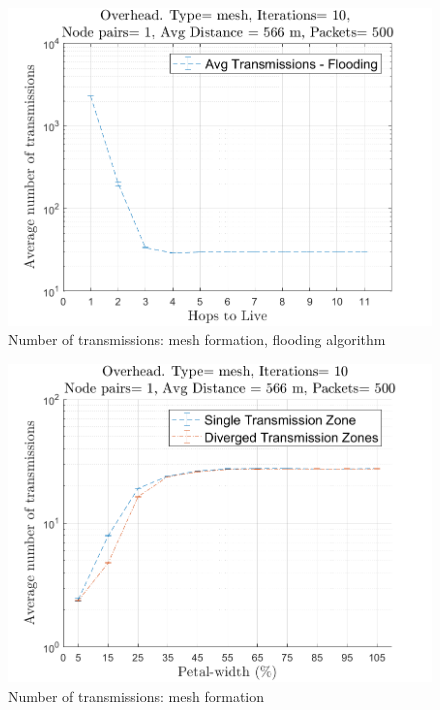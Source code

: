 \begin{figure}[hbtp]
\centering
\includegraphics[width=\simResultFigSize\textwidth,height=\textheight,keepaspectratio]{ncsuthesis-0.6/Chapter-5/figs/fl_trans_mesh.png}
\caption{Number of transmissions: mesh formation, flooding algorithm}
\label{fig:fl_trans_mesh}
\end{figure}

\begin{figure}[hbtp]
\centering
\includegraphics[width=\simResultFigSize\textwidth,height=\textheight,keepaspectratio]{ncsuthesis-0.6/Chapter-5/figs/pe_trans_mesh.png}
\caption{Number of transmissions: mesh formation}
\label{fig:pe_trans_mesh}
\end{figure}

